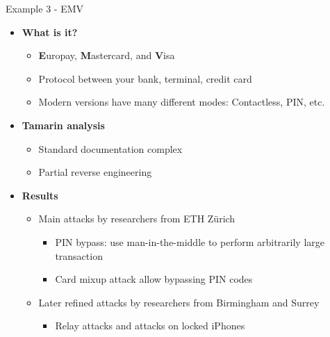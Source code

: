 \documentclass[11pt,aspectratio=169]{beamer}
\begin{document}
\begin{frame}[fragile]{Example 3 - EMV}
    \begin{itemize}
        \item \textbf{What is it?}
        \begin{itemize}
            \item \textbf{E}uropay, \textbf{M}astercard, and \textbf{V}isa
            \item Protocol between your bank, terminal, credit card
            \item Modern versions have many different modes: Contactless, PIN, 
                  etc.
        \end{itemize}
        \item \textbf{Tamarin analysis}
        \begin{itemize}
            \item Standard documentation complex
            \item Partial reverse engineering
        \end{itemize}
        \item \textbf{Results}
        \begin{itemize}
            \item Main attacks by researchers from ETH Z\"{u}rich
            \begin{itemize}
                \item PIN bypass: use man-in-the-middle to perform arbitrarily 
                      large transaction
                \item Card mixup attack allow bypassing PIN codes
            \end{itemize}
            \item Later refined attacks by researchers from Birmingham and 
                  Surrey
            \begin{itemize}
                \item Relay attacks and attacks on locked iPhones
            \end{itemize}
        \end{itemize}
    \end{itemize}
\end{frame}
\end{document}

